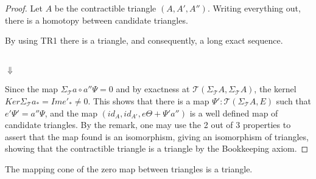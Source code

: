     \begin{proof}
        Let $A$ be the contractible triangle $(A,A',A'')$. Writing everything out, there is a homotopy between candidate triangles.
        \begin{center}
        \end{center}
        By using TR1 there is a triangle, and consequently, a long exact sequence.
        \begin{center}
             \\
            $\Downarrow$ \\
        \end{center}
        Since the map $\Sigma_{\mathcal{T}}a\circ a''\Psi = 0$ and by exactness at $\mathcal{T}(\Sigma_{\mathcal{T}}A,\Sigma_{\mathcal{T}}A)$, the kernel $Ker\Sigma_{\mathcal{T}}a_*=Ime'_*\neq 0$. This shows that there is a map ${\Psi}':\mathcal{T}(\Sigma_{\mathcal{T}}A,E)$ such that $e'{\Psi}'=a''\Psi$, and the map $(id_A,id_{A'},e\Theta+{\Psi}'a'')$ is a well defined map of candidate triangles. By the remark, one may use the 2 out of 3 properties to assert that the map found is an isomorphism, giving an isomorphism of triangles, showing that the contractible triangle is a triangle by the Bookkeeping axiom. 
    \end{proof}

    \begin{corollary}
        The mapping cone of the zero map between  triangles is a triangle. 
    \end{corollary}

